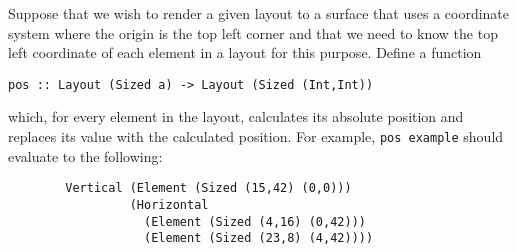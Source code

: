 \begin{parts}
\begin{subparts}
		\subpart[7] Suppose that we wish to render a given layout to a surface that uses a coordinate system where the origin is the top left corner and that we need to know the top left coordinate of each element in a layout for this purpose. Define a function 
		\begin{center}
			\texttt{\small pos~::~Layout (Sized a) -> Layout (Sized (Int,Int))}
		\end{center}
		which, for every element in the layout, calculates its absolute position and replaces its value with the calculated position. For example, \texttt{\small pos example} should evaluate to the following: \droppoints
		\begin{verbatim}
		Vertical (Element (Sized (15,42) (0,0)))
		         (Horizontal 
		           (Element (Sized (4,16) (0,42))) 
		           (Element (Sized (23,8) (4,42))))
		\end{verbatim}
	\end{subparts}
\end{parts}
